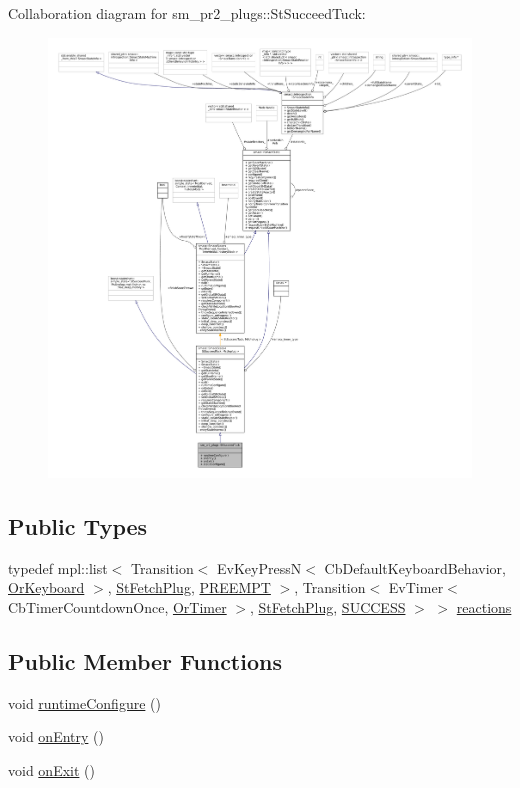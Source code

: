 Collaboration diagram for sm\+\_\+pr2\+\_\+plugs\+:\+:St\+Succeed\+Tuck\+:
\nopagebreak
\begin{figure}[H]
\begin{center}
\leavevmode
\includegraphics[width=350pt]{structsm__pr2__plugs_1_1StSucceedTuck__coll__graph}
\end{center}
\end{figure}
\subsection*{Public Types}
\begin{DoxyCompactItemize}
\item 
typedef mpl\+::list$<$ Transition$<$ Ev\+Key\+PressN$<$ Cb\+Default\+Keyboard\+Behavior, \hyperlink{classsm__pr2__plugs_1_1OrKeyboard}{Or\+Keyboard} $>$, \hyperlink{structsm__pr2__plugs_1_1StFetchPlug}{St\+Fetch\+Plug}, \hyperlink{classPREEMPT}{P\+R\+E\+E\+M\+PT} $>$, Transition$<$ Ev\+Timer$<$ Cb\+Timer\+Countdown\+Once, \hyperlink{classsm__pr2__plugs_1_1OrTimer}{Or\+Timer} $>$, \hyperlink{structsm__pr2__plugs_1_1StFetchPlug}{St\+Fetch\+Plug}, \hyperlink{classSUCCESS}{S\+U\+C\+C\+E\+SS} $>$ $>$ \hyperlink{structsm__pr2__plugs_1_1StSucceedTuck_a5f4cdc033699ffd5e4c7f36e690d245a}{reactions}
\end{DoxyCompactItemize}
\subsection*{Public Member Functions}
\begin{DoxyCompactItemize}
\item 
void \hyperlink{structsm__pr2__plugs_1_1StSucceedTuck_a1cdbe59c4fb6a107b2886745c13e6bc1}{runtime\+Configure} ()
\item 
void \hyperlink{structsm__pr2__plugs_1_1StSucceedTuck_ac24f227b1e528fceed48c7f44bdfea45}{on\+Entry} ()
\item 
void \hyperlink{structsm__pr2__plugs_1_1StSucceedTuck_a940986d5ff1707cab0a88a351d5b15be}{on\+Exit} ()
\end{DoxyCompactItemize}
